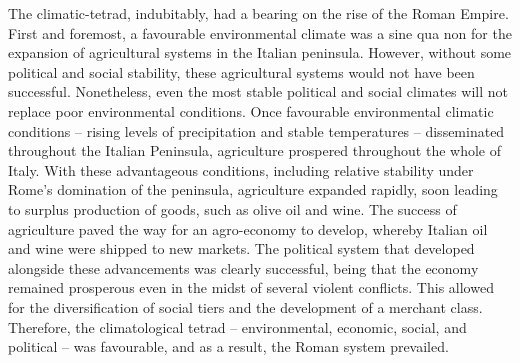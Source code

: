 The climatic-tetrad, indubitably, had a bearing on the rise of the Roman Empire. First and foremost, a favourable environmental climate was a sine qua non for the expansion of agricultural systems in the Italian peninsula. However, without some political and social stability, these agricultural systems would not have been successful. Nonetheless, even the most stable political and social climates will not replace poor environmental conditions. Once favourable environmental climatic conditions – rising levels of precipitation and stable temperatures – disseminated throughout the Italian Peninsula, agriculture prospered 
throughout the whole of Italy. With these advantageous conditions, including relative stability under Rome’s domination of the peninsula, agriculture expanded rapidly, soon leading to surplus production of goods, such as olive oil and wine. The success of agriculture paved the way for an agro-economy to develop, whereby Italian oil and wine were shipped to new markets. The political system that developed alongside these advancements was clearly successful, being that the economy remained prosperous even in the midst of several violent conflicts. This allowed for the diversification of social tiers and the development of a merchant class. Therefore, the climatological tetrad – environmental, economic, social, and political – was favourable, and as a result, the Roman system prevailed. 


